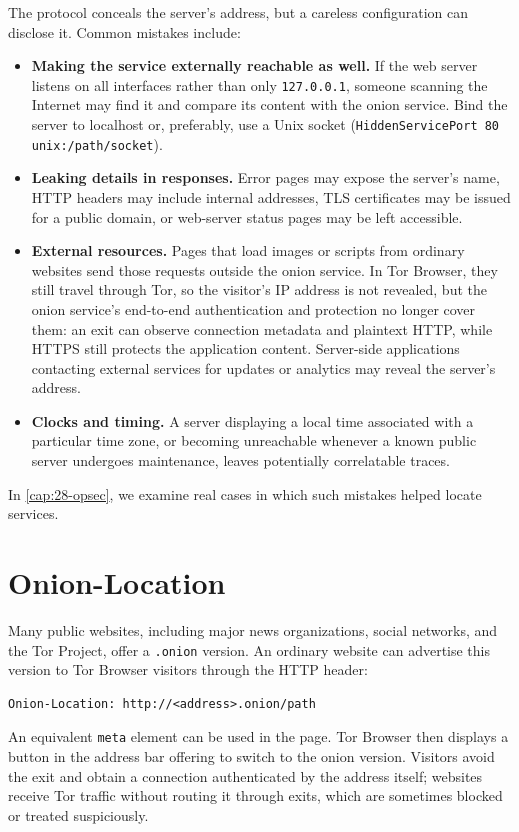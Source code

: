 The protocol conceals the server's address, but a careless configuration can disclose it. Common mistakes include:
\begin{itemize}
  \item \textbf{Making the service externally reachable as well.} If the web server listens on all interfaces rather than only \texttt{127.0.0.1}, someone scanning the Internet may find it and compare its content with the onion service. Bind the server to localhost or, preferably, use a Unix socket (\texttt{HiddenServicePort 80 unix:/path/socket}).
  \item \textbf{Leaking details in responses.} Error pages may expose the server's name, HTTP headers may include internal addresses, TLS certificates may be issued for a public domain, or web-server status pages may be left accessible.
  \item \textbf{External resources.} Pages that load images or scripts from ordinary websites send those requests outside the onion service. In Tor Browser, they still travel through Tor, so the visitor's IP address is not revealed, but the onion service's end-to-end authentication and protection no longer cover them: an exit can observe connection metadata and plaintext HTTP, while HTTPS still protects the application content. Server-side applications contacting external services for updates or analytics may reveal the server's address.
  \item \textbf{Clocks and timing.} A server displaying a local time associated with a particular time zone, or becoming unreachable whenever a known public server undergoes maintenance, leaves potentially correlatable traces.
\end{itemize}
In \cref{cap:28-opsec}, we examine real cases in which such mistakes helped locate services.

\section{Onion-Location}\label{sec:onionp-location}

Many public websites, including major news organizations, social networks, and the Tor Project, offer a \texttt{.onion} version. An ordinary website can advertise this version to Tor Browser visitors through the HTTP header:
\begin{lstlisting}[numbers=none]
Onion-Location: http://<address>.onion/path
\end{lstlisting}
An equivalent \texttt{meta} element can be used in the page. Tor Browser then displays a button in the address bar offering to switch to the onion version. Visitors avoid the exit and obtain a connection authenticated by the address itself; websites receive Tor traffic without routing it through exits, which are sometimes blocked or treated suspiciously.

